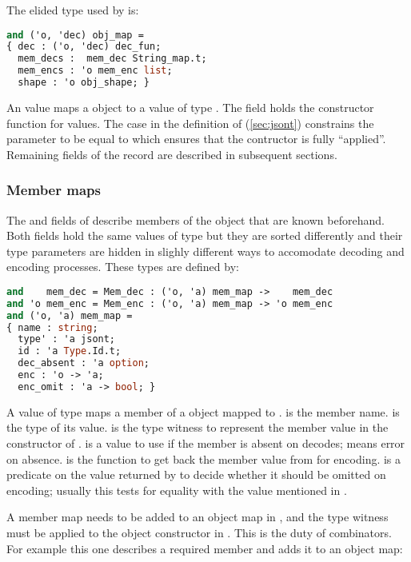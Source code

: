 \documentclass[nolinenum]{jfp}
\begin{document}
The elided type  used by  is:

\begin{lstlisting}[language=ocaml]
and ('o, 'dec) obj_map =
{ dec : ('o, 'dec) dec_fun;
  mem_decs :  mem_dec String_map.t;
  mem_encs : 'o mem_enc list;
  shape : 'o obj_shape; }
\end{lstlisting}
%
An  value maps a \json{} object to a value of type
. The  field holds the constructor function for
 values. The  case in the definition of
 (\autoref{sec:jsont}) constrains the 
parameter to be equal to  which ensures that the contructor
is fully ``applied''. Remaining fields of the record are described in
subsequent sections.

\subsubsection{Member maps}
\label{sec:mem_map}

The  and  fields of 
describe members of the object that are known beforehand. Both fields
hold the same values of type  but they are sorted
differently and their type parameters are hidden in slighly different
ways to accomodate decoding and encoding processes. These types are
defined by:
\pagebreak
\begin{lstlisting}[language=ocaml]
and    mem_dec = Mem_dec : ('o, 'a) mem_map ->    mem_dec
and 'o mem_enc = Mem_enc : ('o, 'a) mem_map -> 'o mem_enc
and ('o, 'a) mem_map =
{ name : string;
  type' : 'a jsont;
  id : 'a Type.Id.t;
  dec_absent : 'a option;
  enc : 'o -> 'a;
  enc_omit : 'a -> bool; }
\end{lstlisting}
%
A value  of type  maps a member  of a
\json{} object mapped to .  is the member
name.  is the \json{} type of its value. 
is the type witness to represent the member value in the constructor
of .  is a value to use if the member is
absent on decodes;  means error on absence. 
is the function to get back the member value from  for
encoding.  is a predicate on the value returned by
 to decide whether it should be omitted on encoding;
usually this tests for equality with the value mentioned in
.

A member map  needs to be added to an object map  in
,  and the  type witness
must be applied to the object constructor in . This is the
duty of combinators. For example this one describes a required member
and adds it to an object map:
\end{document}
